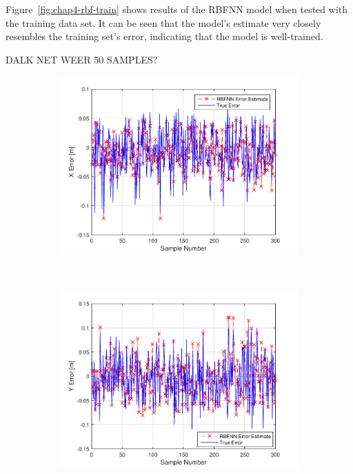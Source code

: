 Figure~\ref{fig:chap4-rbf-train} shows results of the RBFNN model when tested with the training data set. It can be seen that the model's estimate very closely resembles the training set's error, indicating that the model is well-trained. 

DALK NET WEER 50 SAMPLES?

\begin{figure}
  \begin{subfigure}{0.3\textwidth}
    \includegraphics[width=\textwidth]{figures/chapter4/x_train}
    \caption{}
  \end{subfigure}
~
  \begin{subfigure}{0.3\textwidth}
    \includegraphics[width=\textwidth]{figures/chapter4/y_train}

\end{subfigure}
\end{figure}
